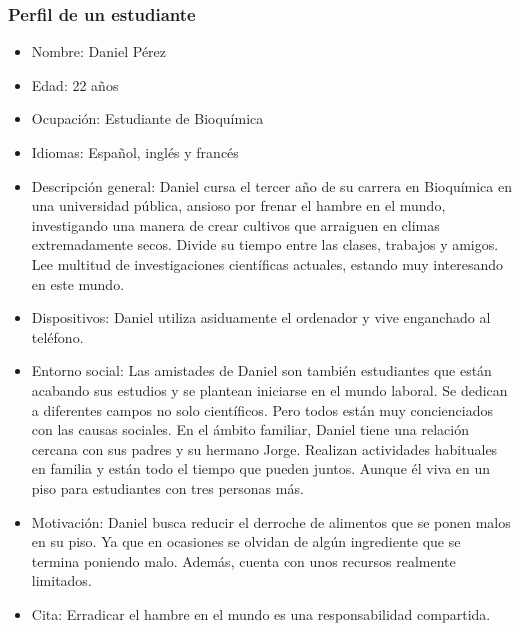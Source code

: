 \subsubsection{Perfil de un estudiante}
\begin{itemize}
    \item Nombre: Daniel Pérez
    \item Edad: 22 años
    \item Ocupación: Estudiante de Bioquímica
    \item Idiomas: Español, inglés y francés
    \item Descripción general: Daniel cursa el tercer año de su carrera en Bioquímica en una universidad pública, ansioso por frenar el hambre en el mundo, investigando una manera de crear cultivos que arraiguen en climas extremadamente secos. Divide su tiempo entre las clases, trabajos y amigos. Lee multitud de investigaciones científicas actuales, estando muy interesando en este mundo.
    \item Dispositivos: Daniel utiliza asiduamente el ordenador y vive enganchado al teléfono.
    \item Entorno social: Las amistades de Daniel son también estudiantes que están acabando sus estudios y se plantean iniciarse en el mundo laboral. Se dedican a diferentes campos no solo científicos. Pero todos están muy concienciados con las causas sociales. En el ámbito familiar, Daniel tiene una relación cercana con sus padres y su hermano Jorge. Realizan actividades habituales en familia y están todo el tiempo que pueden juntos. Aunque él viva en un piso para estudiantes con tres personas más.
    \item Motivación: Daniel busca reducir el derroche de alimentos que se ponen malos en su piso. Ya que en ocasiones se olvidan de algún ingrediente que se termina poniendo malo. Además, cuenta con unos recursos realmente limitados. 
    \item Cita: Erradicar el hambre en el mundo es una responsabilidad compartida.
\end{itemize}

